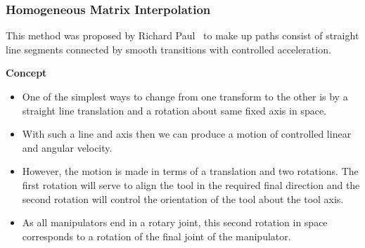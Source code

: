 \documentclass[10pt, aspectratio=169]{beamer}
\theoremstyle{remark}
\theoremstyle{definition}
\begin{document}
\begin{frame}[allowframebreaks]
\frametitle{Homogeneous Matrix Interpolation}

This method was proposed by Richard Paul~\cite{paul1979manipulator} to make up paths consist of straight line segments connected by smooth transitions with controlled acceleration.

\textcolor{uma_blue_dark}{\textbf{Concept}}
\begin{itemize}
    \item One of the simplest ways to change from one transform to the other is by a straight line translation and a rotation about same fixed axis in space.
    \item With such a line and axis then we can produce a motion of controlled linear and angular velocity.
    \item  However, the motion is made in terms of a translation and two rotations. The first rotation will serve to align the tool in the required final direction and the second rotation will control the orientation of the tool about the tool axis.
    \item As all manipulators end in a rotary joint, this second rotation in space corresponds to a rotation of the final joint of the manipulator. 
\end{itemize}

\framebreak



\end{frame}
\end{document}
